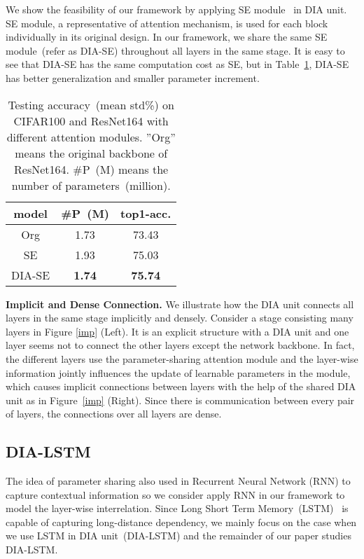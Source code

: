 \documentclass[letterpaper]{article} \usepackage{aaai20}  \usepackage{times}  \usepackage{helvet} \usepackage{courier}  \usepackage[hyphens]{url}  \usepackage{graphicx} \urlstyle{rm} \def\UrlFont{\rm}  \usepackage{graphicx}  \frenchspacing  \setlength{\pdfpagewidth}{8.5in}  \setlength{\pdfpageheight}{11in}  \usepackage{color}
\begin{document}
We show the feasibility of our framework by applying SE module~\cite{hu2018squeeze} in DIA unit. SE module, a representative of attention mechanism, is used for each block individually in its original design. In our framework, we share the same SE module~(refer as DIA-SE) throughout all layers in the same stage. It is easy to see that DIA-SE has the same computation cost as SE, but in Table~\ref{tab:share}, DIA-SE has better generalization and smaller parameter increment.

\begin{table}[htbp]
  \centering
    \begin{tabular}{|c|c|c|}
    \toprule
       model   & \#P~(M) & top1-acc. \\
    \midrule
    Org   & 1.73  & 73.43 \\
    SE    & 1.93  & 75.03 \\
    DIA-SE & \textbf{1.74}  & \textbf{75.74} \\
    \bottomrule
    \end{tabular}\caption{Testing accuracy~(mean  std\%) on CIFAR100 and ResNet164 with different attention modules. ''Org'' means the original backbone of ResNet164. \#P~(M) means the number of parameters~(million).}
      \label{tab:share}\end{table}

	 \textbf{Implicit and Dense Connection.} We illustrate how the DIA unit connects all layers in the same stage implicitly and densely. Consider a stage consisting many layers in Figure \ref{imp} (Left). It is an explicit structure with a DIA unit and one layer seems not to connect the other layers except the network backbone. In fact, the different layers use the parameter-sharing attention module and the layer-wise information jointly influences the update of learnable parameters in the module, which causes implicit connections between layers with the help of the shared DIA unit as in Figure~\ref{imp} (Right). Since there is communication between every pair of layers, the connections over all layers are dense.
	 
	\subsection{DIA-LSTM} 
	The idea of parameter sharing also used in Recurrent Neural Network (RNN) to capture contextual information so we consider apply RNN in our framework to model the layer-wise interrelation. Since Long Short Term Memory~(LSTM)~\cite{hochreiter1997long} is capable of capturing long-distance dependency, we mainly focus on the case when we use LSTM in DIA unit~(DIA-LSTM) and the remainder of our paper studies DIA-LSTM.
	
\end{document}
